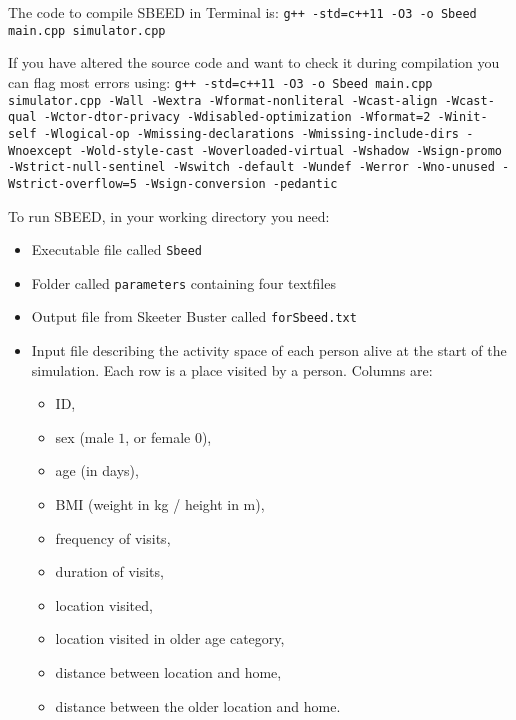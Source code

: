 \documentclass[11pt]{article}
\newcommand{\shellcmd}[1]{\newline\hspace{15pt}\texttt{#1\newline{}}}
\newcommand{\linecmd}[1]{\texttt{#1}}
\begin{document}
The code to compile SBEED in Terminal is: \shellcmd{g++ -std=c++11 -O3 -o Sbeed main.cpp simulator.cpp}

If you have altered the source code and want to check it during compilation you can flag most errors using: \shellcmd{g++ -std=c++11 -O3 -o Sbeed main.cpp simulator.cpp -Wall -Wextra -Wformat-nonliteral -Wcast-align -Wcast-qual -Wctor-dtor-privacy -Wdisabled-optimization -Wformat=2 -Winit-self -Wlogical-op -Wmissing-declarations -Wmissing-include-dirs -Wnoexcept -Wold-style-cast -Woverloaded-virtual -Wshadow -Wsign-promo -Wstrict-null-sentinel -Wswitch -default -Wundef -Werror -Wno-unused -Wstrict-overflow=5 -Wsign-conversion -pedantic}


To run SBEED, in your working directory you need:
\begin{itemize}
	\item Executable file called \linecmd{Sbeed}
	\item Folder called \linecmd{parameters} containing four textfiles
	\item Output file from Skeeter Buster called \linecmd{forSbeed.txt}
	\item Input file describing the activity space of each person alive at the start of the simulation. Each row is a place visited by a person. Columns are:
	\begin{itemize}
		\item ID,
		\item sex (male $1$, or female $0$),
		\item age (in days),
		\item BMI (weight in kg / height in m),
		\item frequency of visits,
		\item duration of visits,
		\item location visited,
		\item location visited in older age category,
		\item distance between location and home,
		\item distance between the older location and home.
	\end{itemize}
	\label{ActivitySpace}
\end{itemize}
\end{document}
